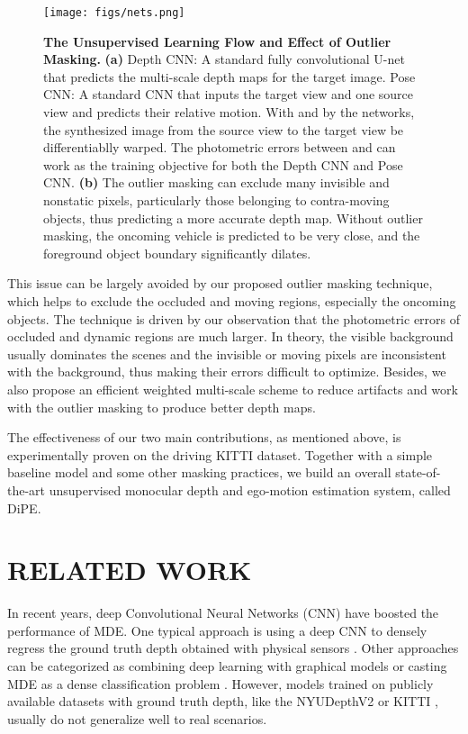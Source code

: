 \documentclass[letterpaper, 10 pt, conference]{ieeeconf}
\begin{document}
\begin{figure*}[t]
\begin{center}
\vspace{6pt}
\texttt{[image: figs/nets.png]}
\end{center}
\vspace{-12pt}
\caption{\textbf{The Unsupervised Learning Flow and Effect of Outlier Masking.} \textbf{(a)} {Depth CNN:} A standard fully convolutional U-net that predicts the multi-scale depth maps for the target image. {Pose CNN:} A standard CNN that inputs the target view and one source view and predicts their relative motion. With  and  by the networks, the synthesized image  from the source view  to the target view  be differentiablly warped. The photometric errors between  and  can work as the training objective for both the Depth CNN and Pose CNN. 
\textbf{(b)} The outlier masking can exclude many invisible and nonstatic pixels, particularly those belonging to contra-moving objects, thus predicting a more accurate depth map. Without outlier masking, the oncoming vehicle is predicted to be very close, and the foreground object boundary significantly dilates.}
\label{fig:framework}
\vspace{-10pt}
\end{figure*}


This issue can be largely avoided by our proposed {outlier masking} technique, which helps to exclude the occluded and moving regions, especially the oncoming objects. 
The technique is driven by our observation that the photometric errors of occluded and dynamic regions are much larger. 
In theory, the visible background usually dominates the scenes and the invisible or moving pixels are inconsistent with the background, thus making their errors difficult to optimize. 
Besides, we also propose an efficient weighted multi-scale scheme to reduce artifacts and work with the outlier masking to produce better depth maps. 

The effectiveness of our two main contributions, as mentioned above, is experimentally proven on the driving KITTI dataset.  Together with a simple baseline model and some other masking practices, we build an overall state-of-the-art unsupervised monocular depth and ego-motion estimation system, called DiPE.

\section{RELATED WORK}
In recent years, deep Convolutional Neural Networks (CNN) have boosted the performance of MDE. One typical approach is using a deep CNN to densely regress the ground truth depth obtained with physical sensors \cite{eigen2014depth, laina2016deeper, zeng2017geocuedepth, jiang2019high}. 
Other approaches can be categorized as combining deep learning with graphical models \cite{wang2015towards, liu2015learning, xu2017multi} or casting MDE as a dense classification problem \cite{cao2017estimating, li2018monocular, fu2018deep}. 
However, models trained on publicly available datasets with ground truth depth, like the NYUDepthV2 \cite{silberman2012indoor} or KITTI \cite{geiger2013vision}, usually do not generalize well to real scenarios.
\end{document}
